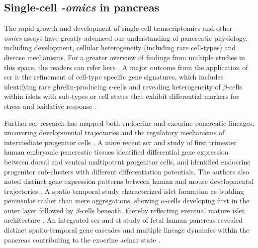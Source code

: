 \subsection{Single-cell \textit{-omics} in pancreas}
\label{sec:single-cell_pancreas}
The rapid growth and development of single-cell transcriptomics and other \textit{–omics} assays have greatly advanced our understanding of pancreatic physiology, including development, cellular heterogeneity (including rare cell-types) and disease mechanisms. For a greater overview of findings from multiple studies in this space, the readers can refer here \textbf{\cite{wang_single-cell_2019,avrahami_beta_2017,carrano_interrogating_2017}}. A major outcome from the application of \gls{scr} is the refinement of cell-type specific gene signatures, which includes identifying rare ghrelin-producing $\epsilon$-cells and revealing heterogeneity of $\beta$-cells within islets with sub-types or cell states that exhibit differential markers for  stress and oxidative response \textbf{\cite{segerstolpe_single-cell_2016,muraro_single-cell_2016}}.\\
\par Further \gls{scr} research has mapped both endocrine and exocrine pancreatic lineages, uncovering developmental trajectories and the regulatory mechanisms of intermediate progenitor cells \textbf{\cite{yu_defining_2019}}. A more recent \gls{scr} and  study of first trimester human embryonic pancreatic tissues identified differential gene expression between dorsal and ventral multipotent progenitor cells, and identified endocrine progenitor sub-clusters with different differentiation potentials. The authors also noted distinct gene expression patterns between human and mouse developmental trajectories \textbf{\cite{ma_deciphering_2023}}. A spatio-temporal study characterized islet formation as budding peninsulas rather than mere aggregations, showing $\alpha$-cells developing first in the outer layer followed by $\beta$-cells beneath, thereby reflecting eventual mature islet architecture \textbf{\cite{sharon_peninsular_2019}}. An integrated \gls{scr} and \gls{st} study of fetal human pancreas revealed distinct spatio-temporal gene cascades and multiple lineage dynamics within the pancreas contributing to the exocrine acinar state \textbf{\cite{olaniru_single-cell_2023}}.\\

